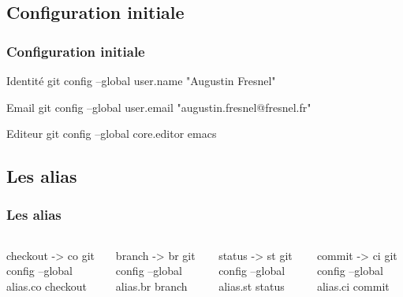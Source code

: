 \documentclass[t,11pt]{beamer}
\begin{document}
\subsection{Configuration initiale}
\begin{frame}
        \frametitle{Configuration initiale}
        \begin{block}{Identit\'e}
                git config --global user.name "Augustin Fresnel"
        \end{block}
        
        \begin{block}{Email}
                git config --global user.email "augustin.fresnel@fresnel.fr"
        \end{block}

        \begin{block}{Editeur}
                git config --global core.editor emacs
        \end{block}
\end{frame}

\subsection{Les alias}
\begin{frame}
        \frametitle{Les alias}
        \vspace{-7mm}
        \begin{columns}

                \begin{block}{checkout -> co}
                        git config --global alias.co checkout
                \end{block}

                \begin{block}{branch -> br}
                        git config --global alias.br branch
                \end{block}

                \begin{block}{status -> st}
                        git config --global alias.st status
                \end{block}

                \begin{block}{commit -> ci}
                        git config --global alias.ci commit
                \end{block}

        \end{columns}
\end{frame}
\end{document}
